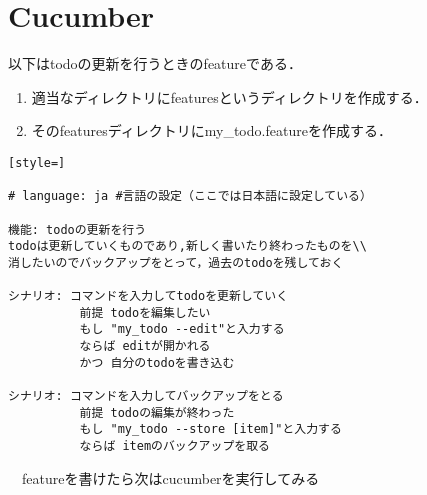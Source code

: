 \section{Cucumber}
以下はtodoの更新を行うときのfeatureである．
\begin{enumerate}
\item 適当なディレクトリにfeaturesというディレクトリを作成する．
\item そのfeaturesディレクトリにmy\_todo.featureを作成する．
\end{enumerate}\begin{lstlisting}[style=]

# language: ja #言語の設定（ここでは日本語に設定している）

機能: todoの更新を行う
todoは更新していくものであり,新しく書いたり終わったものを\\
消したいのでバックアップをとって，過去のtodoを残しておく

シナリオ: コマンドを入力してtodoを更新していく
          前提 todoを編集したい
          もし "my_todo --edit"と入力する
          ならば editが開かれる
          かつ 自分のtodoを書き込む

シナリオ: コマンドを入力してバックアップをとる
          前提 todoの編集が終わった
          もし "my_todo --store [item]"と入力する
          ならば itemのバックアップを取る

\end{lstlisting}
　featureを書けたら次はcucumberを実行してみる
